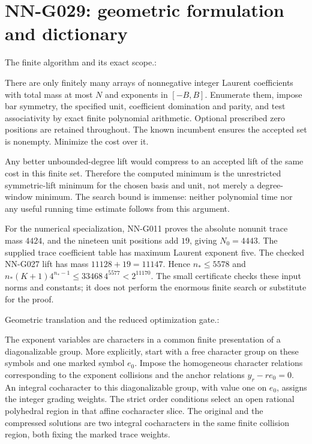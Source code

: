 \section{NN-G029: geometric formulation and dictionary}
\begin{geometricstatement}[NN-G029]
The finite algorithm and its exact scope.:

There are only finitely many arrays of nonnegative integer
Laurent coefficients with total mass at most $N$ and
exponents in $[-B,B]$. Enumerate them, impose bar symmetry,
the specified unit, coefficient domination and parity,
and test associativity by exact finite polynomial
arithmetic. Optional prescribed zero positions are
retained throughout. The known incumbent ensures the
accepted set is nonempty. Minimize the cost over it.

Any better unbounded-degree lift would compress to an
accepted lift of the same cost in this finite set.
Therefore the computed minimum is the unrestricted
symmetric-lift minimum for the chosen basis and unit,
not merely a degree-window minimum. The search bound is
immense: neither polynomial time nor any useful running
time estimate follows from this argument.

For the numerical specialization, NN-G011 proves the
absolute nonunit trace mass $4424$, and the nineteen
unit positions add $19$, giving $N_0=4443$.
The supplied trace coefficient table has maximum
Laurent exponent five. The checked NN-G027 lift has
mass $11128+19=11147$. Hence $n_*\le5578$ and
$n_*(K+1)4^{n_*-1}\le33468\,4^{5577}<2^{11170}$.
The small certificate
 checks
these input norms and constants; it does not perform
the enormous finite search or substitute for the proof.


Geometric translation and the reduced optimization gate.:

The exponent variables are characters in a common finite
presentation of a diagonalizable group. More explicitly,
start with a free character group on these symbols and
one marked symbol $e_0$. Impose the homogeneous character
relations corresponding to the exponent collisions and
the anchor relations $y_r-r e_0=0$. An integral cocharacter
to this diagonalizable group, with value one on $e_0$,
assigns the integer grading weights. The strict order
conditions select an open rational polyhedral region
in that affine cocharacter slice. The original and the
compressed solutions are two integral cocharacters in
the same finite collision region, both fixing the marked
trace weights.


\end{geometricstatement}

